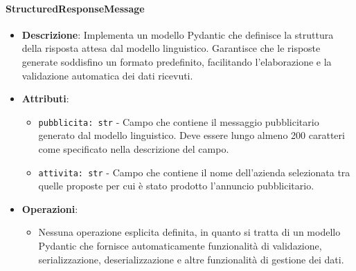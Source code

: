 \documentclass[10pt]{article}
\begin{document}
    \paragraph{StructuredResponseMessage}
    \begin{itemize} 
    \item \textbf{Descrizione}: Implementa un modello Pydantic che definisce la struttura della risposta attesa dal modello linguistico. Garantisce che le risposte generate soddisfino un formato predefinito, facilitando l'elaborazione e la validazione automatica dei dati ricevuti.
    \item \textbf{Attributi}:
    \begin{itemize}
        \item \texttt{pubblicita: str} - Campo che contiene il messaggio pubblicitario generato dal modello linguistico. Deve essere lungo almeno 200 caratteri come specificato nella descrizione del campo.
        \item \texttt{attivita: str} - Campo che contiene il nome dell'azienda selezionata tra quelle proposte per cui è stato prodotto l'annuncio pubblicitario.
    \end{itemize}
    
    \item \textbf{Operazioni}:
    \begin{itemize}
        \item Nessuna operazione esplicita definita, in quanto si tratta di un modello Pydantic che fornisce automaticamente funzionalità di validazione, serializzazione, deserializzazione e altre funzionalità di gestione dei dati.
    \end{itemize}
    \end{itemize}
\end{document}
